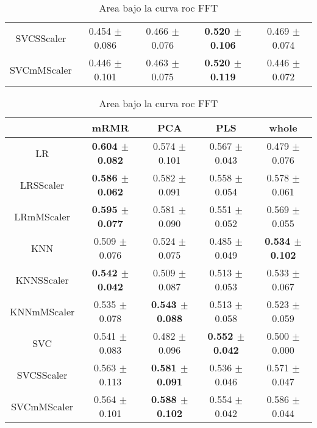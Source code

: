 \documentclass[]{report}
\begin{document}
\begin{table}
\begin{tabular}{c|cccc}
			 SVCSScaler  & 0.454 $\pm$ 0.086 & 0.466 $\pm$ 0.076 & \textbf{0.520 $\pm$ 0.106} & 0.469 $\pm$ 0.074 \\
			 SVCmMScaler & 0.446 $\pm$ 0.101 & 0.463 $\pm$ 0.075 & \textbf{0.520 $\pm$ 0.119} & 0.446 $\pm$ 0.072 \\
			\hline
		\end{tabular}
		\caption{\label{tab:auc_score_DCOR} Area bajo la curva roc DCOR}
		\vspace*{2cm}
		\begin{tabular}{c|cccc}
			\hline
			             & mRMR            & PCA             & PLS             & whole           \\
			\hline
			 LR          & \textbf{0.604 $\pm$ 0.082} & 0.574 $\pm$ 0.101 & 0.567 $\pm$ 0.043 & 0.479 $\pm$ 0.076 \\
			 LRSScaler   & \textbf{0.586 $\pm$ 0.062} & 0.582 $\pm$ 0.091 & 0.558 $\pm$ 0.054 & 0.578 $\pm$ 0.061 \\
			 LRmMScaler  & \textbf{0.595 $\pm$ 0.077} & 0.581 $\pm$ 0.090 & 0.551 $\pm$ 0.052 & 0.569 $\pm$ 0.055 \\
			 KNN         & 0.509 $\pm$ 0.076 & 0.524 $\pm$ 0.075 & 0.485 $\pm$ 0.049 & \textbf{0.534 $\pm$ 0.102} \\
			 KNNSScaler  & \textbf{0.542 $\pm$ 0.042} & 0.509 $\pm$ 0.087 & 0.513 $\pm$ 0.053 & 0.533 $\pm$ 0.067 \\
			 KNNmMScaler & 0.535 $\pm$ 0.078 & \textbf{0.543 $\pm$ 0.088} & 0.513 $\pm$ 0.058 & 0.523 $\pm$ 0.059 \\
			 SVC         & 0.541 $\pm$ 0.083 & 0.482 $\pm$ 0.096 & \textbf{0.552 $\pm$ 0.042} & 0.500 $\pm$ 0.000 \\
			 SVCSScaler  & 0.563 $\pm$ 0.113 & \textbf{0.581 $\pm$ 0.091} & 0.536 $\pm$ 0.046 & 0.571 $\pm$ 0.047 \\
			 SVCmMScaler & 0.564 $\pm$ 0.101 & \textbf{0.588 $\pm$ 0.102} & 0.554 $\pm$ 0.042 & 0.586 $\pm$ 0.044 \\
			\hline
		\end{tabular}
		\caption{\label{tab:auc_score_FFT} Area bajo la curva roc FFT}
		\vspace*{2cm}
	\end{table}
\end{document}
